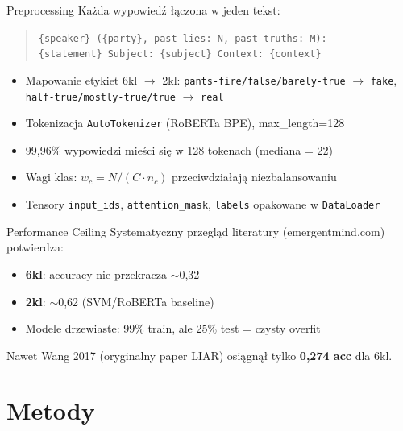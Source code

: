 \documentclass[10pt]{beamer}
\begin{document}
\begin{frame}{Preprocessing}
  Każda wypowiedź łączona w jeden tekst:
  \begin{quote}\small
    \texttt{\{speaker\} (\{party\}, past lies: N, past truths: M):\\
    \{statement\} Subject: \{subject\} Context: \{context\}}
  \end{quote}

  \begin{itemize}
    \item Mapowanie etykiet 6kl $\to$ 2kl:
          \texttt{pants-fire/false/barely-true} $\to$ \texttt{fake},\\
          \texttt{half-true/mostly-true/true} $\to$ \texttt{real}
    \item Tokenizacja \texttt{AutoTokenizer} (RoBERTa BPE), max\_length=128
    \item 99{,}96\% wypowiedzi mieści się w 128 tokenach (mediana = 22)
    \item Wagi klas: $w_c = N/(C \cdot n_c)$
          przeciwdziałają niezbalansowaniu
    \item Tensory \texttt{input\_ids}, \texttt{attention\_mask}, \texttt{labels}
          opakowane w \texttt{DataLoader}
  \end{itemize}
\end{frame}

\begin{frame}{Performance Ceiling}
  Systematyczny przegląd literatury (emergentmind.com) potwierdza:
  \begin{itemize}
    \item \textbf{6kl}: accuracy nie przekracza $\sim$0{,}32
    \item \textbf{2kl}: $\sim$0{,}62 (SVM/RoBERTa baseline)
    \item Modele drzewiaste: 99\% train, ale 25\% test = czysty overfit
  \end{itemize}

  \vspace{0.5em}
  Nawet Wang 2017 (oryginalny paper LIAR) osiągnął tylko \textbf{0{,}274 acc} dla 6kl.
\end{frame}

\section{Metody}
\end{document}
